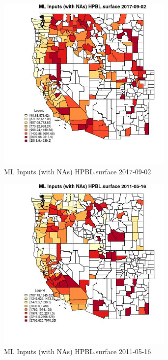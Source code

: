 \begin{figure} 
\centering  
\includegraphics[width=0.77\textwidth]{Code_Outputs/Report_ML_input_PM25_Step4_part_e_de_duplicated_aves_compiled_2019-05-21wNAs_CountyHPBLsurfaceMean2017-09-02.jpg} 
\caption{\label{fig:Report_ML_input_PM25_Step4_part_e_de_duplicated_aves_compiled_2019-05-21wNAsCountyHPBLsurfaceMean2017-09-02}ML Inputs (with NAs) HPBL.surface 2017-09-02} 
\end{figure} 
 

\begin{figure} 
\centering  
\includegraphics[width=0.77\textwidth]{Code_Outputs/Report_ML_input_PM25_Step4_part_e_de_duplicated_aves_compiled_2019-05-21wNAs_CountyHPBLsurfaceMean2011-05-16.jpg} 
\caption{\label{fig:Report_ML_input_PM25_Step4_part_e_de_duplicated_aves_compiled_2019-05-21wNAsCountyHPBLsurfaceMean2011-05-16}ML Inputs (with NAs) HPBL.surface 2011-05-16} 
\end{figure} 
 

